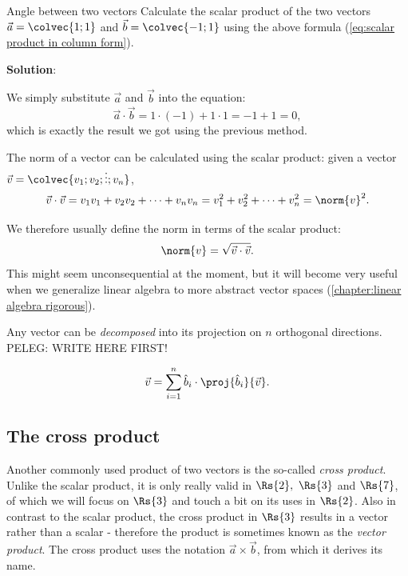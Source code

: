\begin{example}{Angle between two vectors}{ }
	Calculate the scalar product of the two vectors $\vec{a}=\colvec{1;1}$ and $\vec{b}=\colvec{-1;1}$ using the above formula (\autoref{eq:scalar product in column form}).

	\textbf{Solution}:
	
	We simply substitute $\vec{a}$ and $\vec{b}$ into the equation:
	\[
		\vec{a}\cdot\vec{b} = 1\cdot(-1) + 1\cdot1 = -1+1 = 0,
	\]
	which is exactly the result we got using the previous method.
\end{example}

The norm of a vector can be calculated using the scalar product: given a vector $\vec{v}=\colvec{v_{1};v_{2};\vdots;v_{n}}$,
\begin{equation}
	\vec{v}\cdot\vec{v} = v_{1}v_{1} + v_{2}v_{2} + \cdots + v_{n}v_{n} = v_{1}^{2} + v_{2}^{2} + \cdots + v_{n}^{2} = \norm{v}^{2}.
	\label{eq:scalar product to norm}
\end{equation}

We therefore usually define the norm in terms of the scalar product:
\begin{equation}
	\norm{v} = \sqrt{\vec{v}\cdot\vec{v}}.
	\label{eq:norm from scalar product}
\end{equation}
This might seem unconsequential at the moment, but it will become very useful when we generalize linear algebra to more abstract vector spaces (\autoref{chapter:linear algebra rigorous}).

Any vector can be \emph{decomposed} into its projection on $n$ orthogonal directions.
PELEG: WRITE HERE FIRST!

\begin{equation}
	\vec{v} = \sum\limits_{i=1}^{n}\hat{b}_{i}\cdot\proj{\hat{b}_{i}}{\vec{v}}.
	\label{eq:vector decomposition to orthogonal directions}
\end{equation}

\subsection{The cross product}
Another commonly used product of two vectors is the so-called \emph{cross product}. Unlike the scalar product, it is only really valid in $\Rs{2},\ \Rs{3}$ and $\Rs{7}$, of which we will focus on $\Rs{3}$ and touch a bit on its uses in $\Rs{2}$. Also in contrast to the scalar product, the cross product in $\Rs{3}$ results in a vector rather than a scalar - therefore the product is sometimes known as the \emph{vector product}. The cross product uses the notation $\vec{a}\times\vec{b}$, from which it derives its name.

